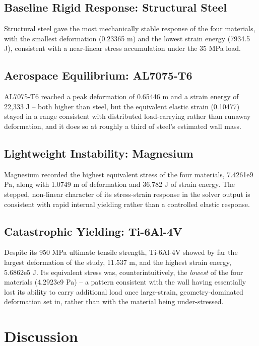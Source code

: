 \documentclass[conference]{IEEEtran}
\begin{document}
\subsection{Baseline Rigid Response: Structural Steel}
Structural steel gave the most mechanically stable response of the four materials, with the smallest deformation (0.23365 m) and the lowest strain energy (7934.5 J), consistent with a near-linear stress accumulation under the 35 MPa load.

\subsection{Aerospace Equilibrium: AL7075-T6}
AL7075-T6 reached a peak deformation of 0.65446 m and a strain energy of 22{,}333 J -- both higher than steel, but the equivalent elastic strain (0.10477) stayed in a range consistent with distributed load-carrying rather than runaway deformation, and it does so at roughly a third of steel's estimated wall mass.

\subsection{Lightweight Instability: Magnesium}
Magnesium recorded the highest equivalent stress of the four materials, 7.4261e9 Pa, along with 1.0749 m of deformation and 36{,}782 J of strain energy. The stepped, non-linear character of its stress-strain response in the solver output is consistent with rapid internal yielding rather than a controlled elastic response.

\subsection{Catastrophic Yielding: Ti-6Al-4V}
Despite its 950 MPa ultimate tensile strength, Ti-6Al-4V showed by far the largest deformation of the study, 11.537 m, and the highest strain energy, 5.6862e5 J. Its equivalent stress was, counterintuitively, the \emph{lowest} of the four materials (4.2923e9 Pa) -- a pattern consistent with the wall having essentially lost its ability to carry additional load once large-strain, geometry-dominated deformation set in, rather than with the material being under-stressed.

\section{Discussion}
\end{document}
